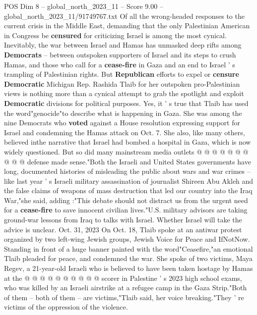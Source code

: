 \begin{textsample}{POS Dim 8 – global\_north\_2023\_11 – Score 9.00 – global\_north\_2023\_11/91749767.txt}  \label{ex:f8_pos_130}
Of all the wrong-headed responses to the current crisis in the Middle East, demanding that the only Palestinian American in Congress be \textbf{censured} for criticizing Israel is among the most cynical.
Inevitably, the war between Israel and Hamas has unmasked deep rifts among \textbf{Democrats} -- between outspoken supporters of Israel and its steps to crush Hamas, and those who call for a \textbf{cease-fire} in Gaza and an end to Israel ' s trampling of Palestinian rights.
But \textbf{Republican} efforts to expel or \textbf{censure} \textbf{Democratic} Michigan Rep.
Rashida Tlaib for her outspoken pro-Palestinian views is nothing more than a cynical attempt to grab the spotlight and exploit \textbf{Democratic} divisions for political purposes.
Yes, it ' s true that Tlaib has used the word"genocide"to describe what is happening in Gaza.
She was among the nine Democrats who \textbf{voted} against a House resolution expressing support for Israel and condemning the Hamas attack on Oct. 7.
She also, like many others, believed inthe narrative that Israel had bombed a hospital in Gaza, which is now widely questioned.
But so did many mainstream media outlets @ @ @ @ @ @ @ @ @ @ defense made sense."Both the Israeli and United States governments have long, documented histories of misleading the public about wars and war crimes -- like last year ' s Israeli military assassination of journalist Shireen Abu Akleh and the false claims of weapons of mass destruction that led our country into the Iraq War,"she said, adding :"This debate should not distract us from the urgent need for a \textbf{cease-fire} to save innocent civilian lives."U.S. military advisors are taking ground-war lessons from Iraq to talks with Israel.
Whether Israel will take the advice is unclear.
Oct. 31, 2023 On Oct. 18, Tlaib spoke at an antiwar protest organized by two left-wing Jewish groups, Jewish Voice for Peace and IfNotNow.
Standing in front of a huge banner painted with the word"Ceasefire,"an emotional Tlaib pleaded for peace, and condemned the war.
She spoke of two victims, Maya Regev, a 21-year-old Israeli who is believed to have been taken hostage by Hamas at the @ @ @ @ @ @ @ @ @ @ scorer in Palestine ' s 2023 high school exams, who was killed by an Israeli airstrike at a refugee camp in the Gaza Strip."Both of them -- both of them -- are victims,"Tlaib said, her voice breaking."They ' re victims of the oppression of the violence.

\end{textsample}
